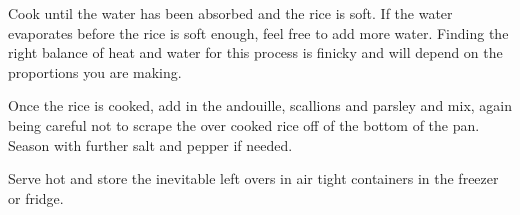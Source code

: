\begin{recipe}
{		\step Cook until the water has been absorbed and the rice is soft. If the water evaporates before the rice is soft enough, feel free to add more water. Finding the right balance of heat and water for this process is finicky and will depend on the proportions you are making.

		\step Once the rice is cooked, add in the andouille, scallions and parsley and mix, again being careful not to scrape the over cooked rice off of the bottom of the pan. Season with further salt and pepper if needed.

		\step Serve hot and store the inevitable left overs in air tight containers in the freezer or fridge.

	}

\end{recipe}